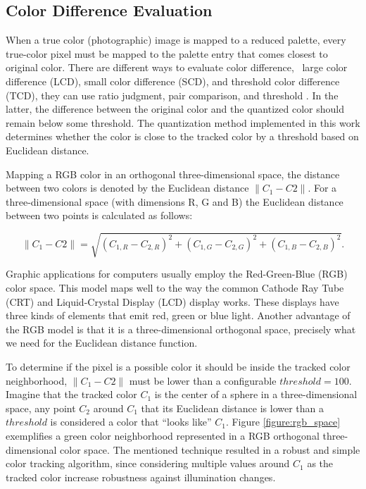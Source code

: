 
\subsection{Color Difference Evaluation} %
\label{sub:tracking_library_for_the_web:color_tracking_algorithm:color_difference_evaluation}

When a true color (photographic) image is mapped to a reduced palette, every true-color pixel must be mapped to the palette entry that comes closest to original color.
There are different ways to evaluate color difference, \ie\ large color difference (LCD), small color difference (SCD), and threshold color difference (TCD), they can use ratio judgment, pair comparison, and threshold \cite{Li2003}. In the latter, the difference between the original color and the quantized color should remain below some threshold. The quantization method implemented in this work determines whether the color is close to the tracked color by a threshold based on Euclidean distance.

Mapping a RGB color in an orthogonal three-dimensional space, the distance between two colors is denoted by the Euclidean distance $\|C_1-C2\|$. For a three-dimensional space (with dimensions R, G and B) the Euclidean distance between two points is calculated as follows:

$$\|C_1-C2\|=\sqrt{(C_{1,R}-C_{2,R})^2 + (C_{1,G}-C_{2,G})^2 + (C_{1,B}-C_{2,B})^2}.$$

Graphic applications for computers usually employ the Red-Green-Blue (RGB) color space. This model maps well to the way the common Cathode Ray Tube (CRT) and Liquid-Crystal Display (LCD) display works. These displays have three kinds of elements that emit red, green or blue light. Another advantage of the RGB model is that it is a three-dimensional orthogonal space, precisely what we need for the Euclidean distance function.

To determine if the pixel is a possible color it should be inside the tracked color neighborhood, $\|C_1-C2\|$ must be lower than a configurable $threshold=100$. Imagine that the tracked color $C_1$ is the center of a sphere in a three-dimensional space, any point $C_2$ around $C_1$ that its Euclidean distance is lower than a $threshold$ is considered a color that ``looks like'' $C_1$. Figure \ref{figure:rgb_space} exemplifies a green color neighborhood represented in a RGB orthogonal three-dimensional color space. The mentioned technique resulted in a robust and simple color tracking algorithm, since considering multiple values around $C_1$ as the tracked color increase robustness against illumination changes.


